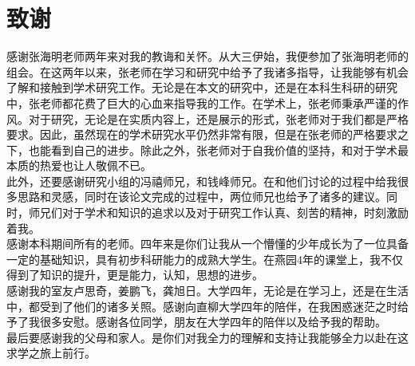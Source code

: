 
\chapter{致谢}

\indent 感谢张海明老师两年来对我的教诲和关怀。从大三伊始，我便参加了张海明老师的组会。在这两年以来，张老师在学习和研究中给予了我诸多指导，让我能够有机会了解和接触到学术研究工作。无论是在本文的研究中，还是在本科生科研的研究中，张老师都花费了巨大的心血来指导我的工作。在学术上，张老师秉承严谨的作风。对于研究，无论是在实质内容上，还是展示的形式，张老师对于我们都是严格要求。因此，虽然现在的学术研究水平仍然非常有限，但是在张老师的严格要求之下，也能看到自己的进步。除此之外，张老师对于自我价值的坚持，和对于学术最本质的热爱也让人敬佩不已。\\
\indent 此外，还要感谢研究小组的冯禧师兄，和钱峰师兄。在和他们讨论的过程中给我很多思路和灵感，同时在该论文完成的过程中，两位师兄也给予了诸多的建议。同时，师兄们对于学术和知识的追求以及对于研究工作认真、刻苦的精神，时刻激励着我。\\
\indent 感谢本科期间所有的老师。四年来是你们让我从一个懵懂的少年成长为了一位具备一定的基础知识，具有初步科研能力的成熟大学生。在燕园4年的课堂上，我不仅得到了知识的提升，更是能力，认知，思想的进步。\\
\indent 感谢我的室友卢思奇，姜鹏飞，龚旭日。大学四年，无论是在学习上，还是在生活中，都受到了他们的诸多关照。感谢向直柳大学四年的陪伴，在我困惑迷茫之时给予了我很多安慰。感谢各位同学，朋友在大学四年的陪伴以及给予我的帮助。\\
\indent 最后要感谢我的父母和家人。是你们对我全力的理解和支持让我能够全力以赴在这求学之旅上前行。